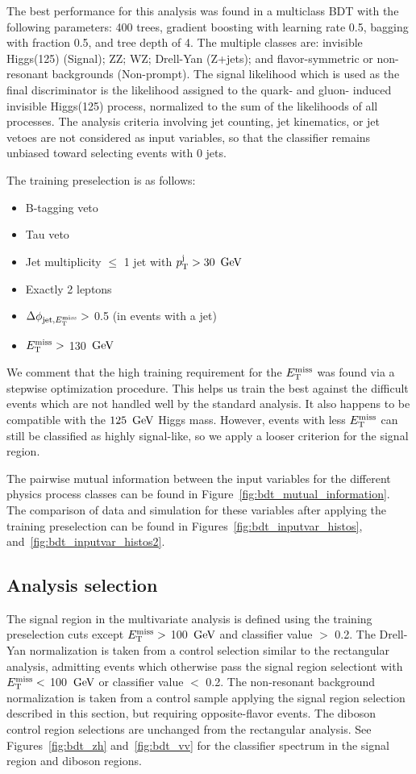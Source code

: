 The best performance for this analysis was found in a multiclass BDT with the following parameters: 400 trees, gradient boosting with learning rate 0.5, bagging with fraction 0.5, and tree depth of 4.
The multiple classes are: invisible Higgs(125) (Signal); ZZ; WZ; Drell-Yan (Z+jets); and flavor-symmetric or non-resonant backgrounds (Non-prompt).
The signal likelihood which is used as the final discriminator is the likelihood assigned to the quark- and gluon- induced invisible Higgs(125) process, normalized to the sum of the likelihoods of all processes.
The analysis criteria involving jet counting, jet kinematics, or jet vetoes are not considered as input variables, so that the classifier remains unbiased toward selecting events with 0 jets.

The training preselection is as follows:
\begin{itemize}
\item B-tagging veto
\item Tau veto
\item Jet multiplicity $\leq$ 1 jet with $p_{\mathrm{T}}^{\rm j} > 30~\,\text{Ge\hspace{-.08em}V}$
\item Exactly 2 leptons
\item $\Delta \phi_{{\rm jet},E_\mathrm{T}^{\mathrm{miss}}} >$ 0.5 (in events with a jet)
\item $E_\mathrm{T}^{\mathrm{miss}} >$ 130 $\,\text{Ge\hspace{-.08em}V}$
\end{itemize}
We comment that the high training requirement for the $E_\mathrm{T}^{\mathrm{miss}}$ was found via a stepwise optimization procedure.
This helps us train the best against the difficult events which are not handled well by the standard analysis.
It also happens to be compatible with the $125~\,\text{Ge\hspace{-.08em}V}$ Higgs mass.
However, events with less $E_\mathrm{T}^{\mathrm{miss}}$ can still be classified as highly signal-like, so we apply a looser criterion for the signal region.

The pairwise mutual information between the input variables for the different physics process classes can be found in Figure~\ref{fig:bdt_mutual_information}.
The comparison of data and simulation for these variables after applying the training preselection can be found in Figures~\ref{fig:bdt_inputvar_histos}, and~\ref{fig:bdt_inputvar_histos2}.


\subsection{Analysis selection} 

The signal region in the multivariate analysis is defined using the training preselection cuts except $E_\mathrm{T}^{\mathrm{miss}} >$ 100 $\,\text{Ge\hspace{-.08em}V}$ and classifier value $>$ 0.2. 
The Drell-Yan normalization is taken from a control selection similar to the rectangular analysis, admitting events which otherwise pass the signal region selectiont with $E_\mathrm{T}^{\mathrm{miss}} <$ 100 $\,\text{Ge\hspace{-.08em}V}$ or classifier value $<$ 0.2.
The non-resonant background normalization is taken from a control sample applying the signal region selection 
described in this section, but requiring opposite-flavor events. The diboson control region 
selections are unchanged from the rectangular analysis. See Figures~\ref{fig:bdt_zh} 
and~\ref{fig:bdt_vv} for the classifier spectrum in the signal region and diboson regions.

